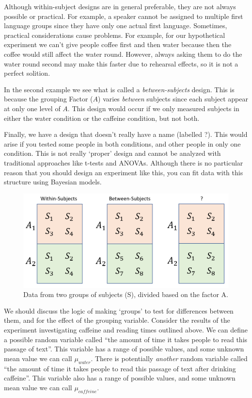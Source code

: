 \documentclass[
]{book}
\begin{document}
Although within-subject designs are in general preferable, they are not always possible or practical. For example, a speaker cannot be assigned to multiple first language groups since they have only one actual first language. Sometimes, practical considerations cause problems. For example, for our hypothetical experiment we can't give people coffee first and then water because then the coffee would still affect the water round. However, always asking them to do the water round second may make this faster due to rehearsal effects, so it is not a perfect solition.

In the second example we see what is called a \emph{between-subjects} design. This is because the grouping Factor (\(A\)) varies \emph{between} subjects since each subject appear at only one level of \(A\). This design would occur if we only measured subjects in either the water condition or the caffeine condition, but not both.

Finally, we have a design that doesn't really have a name (labelled ?). This would arise if you tested some people in both conditions, and other people in only one condition. This is not really `proper' design and cannot be analyzed with traditional approaches like t-tests and ANOVAs. Although there is no particular reason that you should design an experiment like this, you can fit data with this structure using Bayesian models.

\begin{figure}

{\centering \includegraphics[width=0.8\linewidth]{./images/design_ch3} 

}

\caption{Data from two groups of subjects (S), divided based on the factor A.}\label{fig:F3-interactionfig}
\end{figure}

We should discuss the logic of making `groups' to test for differences between them, and for the effect of the grouping variable. Consider the results of the experiment investigating caffeine and reading times outlined above. We can define a possible random variable called ``the amount of time it takes people to read this passage of text''. This variable has a range of possible values, and some unknown mean value we can call \(\mu_{water}\). There is potentially \emph{another} random variable called ``the amount of time it takes people to read this passage of text after drinking caffeine''. This variable also has a range of possible values, and some unknown mean value we can call \(\mu_{caffeine}\).
\end{document}
